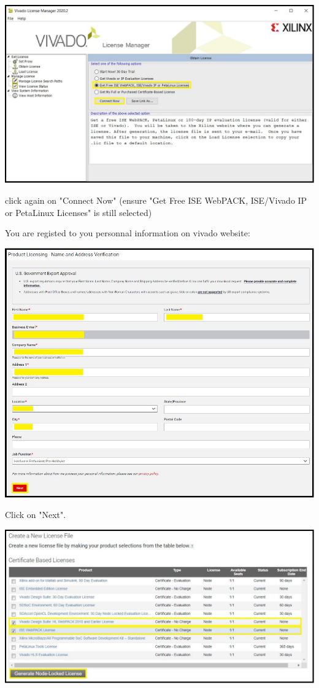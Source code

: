 \includegraphics[width=\linewidth]{images/VivadoInstimg023.jpg}

click again on "Connect Now" (ensure "Get Free ISE WebPACK, ISE/Vivado IP or PetaLinux Licenses" is still selected)

You are registed to you personnal information on vivado website:

\includegraphics[width=\linewidth]{images/VivadoInstimg025.jpg}

Click on "Next".

\includegraphics[width=\linewidth]{images/VivadoInstimg026.jpg}

